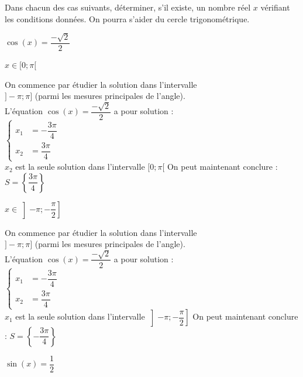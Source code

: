 \documentclass[11pt,a4paper]{article}  %
\begin{document}
Dans chacun des cas suivants, déterminer, s'il existe, un nombre réel $x$ vérifiant les conditions données. On pourra s'aider du cercle trigonométrique.
	\begin{enumMet}
		\item $\cos (x)=\dfrac{-\sqrt{2}}{2}$
			\begin{enumMet}
				\item $x \in[0 ; \pi[$
				\begin{corrBox}
					On commence par étudier la solution dans l'intervalle\\ $]-\pi;\pi]$ (parmi les mesures principales de l'angle).\\
					L'équation $\cos (x)=\dfrac{-\sqrt{2}}{2}$ a pour solution :\\
					$\begin{cases}
						x_1 &=-\dfrac{3\pi}{4}\\
						x_2 &=\dfrac{3\pi}{4}
					\end{cases}$\\
					$x_2$ est la seule solution dans l'intervalle $[0 ; \pi[$
					On peut maintenant conclure : $S=\left\{\dfrac{3\pi}{4}\right\}$	
				\end{corrBox}
				\item $x \in\left]-\pi ;-\dfrac{\pi}{2}\right]$
				\begin{corrBox}
					On commence par étudier la solution dans l'intervalle\\ $]-\pi;\pi]$ (parmi les mesures principales de l'angle).\\
					L'équation $\cos (x)=\dfrac{-\sqrt{2}}{2}$ a pour solution :\\
					$\begin{cases}
						x_1 &=-\dfrac{3\pi}{4}\\
						x_2 &=\dfrac{3\pi}{4}
					\end{cases}$\\
					$x_1$ est la seule solution dans l'intervalle $\left]-\pi ;-\dfrac{\pi}{2}\right]$
					On peut maintenant conclure : $S=\left\{-\dfrac{3\pi}{4}\right\}$	
				\end{corrBox}
			\end{enumMet}
		\item $\sin (x)=\dfrac{1}{2}$
			\begin{enumMet}

\end{enumMet}
\end{enumMet}
\end{document}

